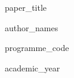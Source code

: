 \begin{titlepage}\vfill {\Huge {{paper_title}}\par}\vfill {{author_names}}\par {{programme_code}}\par {{academic_year}}\end{titlepage}
